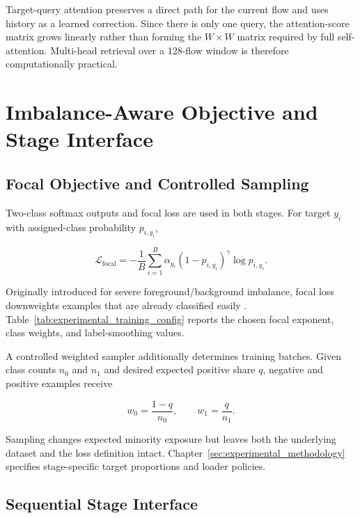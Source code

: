 \documentclass[11pt,fleqn]{report}
\begin{document}
Target-query attention preserves a direct path for the current flow and uses history as a learned correction. Since there is only one query, the attention-score matrix grows linearly rather than forming the $W\times W$ matrix required by full self-attention. Multi-head retrieval over a 128-flow window is therefore computationally practical.
\section{Imbalance-Aware Objective and Stage Interface}
\label{subsec:method_training}

\subsection{Focal Objective and Controlled Sampling}
\label{subsubsec:focal_training}

Two-class softmax outputs and focal loss are used in both stages. For target $y_i$ with assigned-class probability $p_{i,y_i}$,

\begin{equation}
    \mathcal{L}_{\mathrm{focal}}
    =-\frac{1}{B}
      \sum_{i=1}^{B}
      \alpha_{y_i}
      \left(1-p_{i,y_i}\right)^{\gamma}
      \log p_{i,y_i}.
    \label{eq:method_focal_loss}
\end{equation}

Originally introduced for severe foreground/background imbalance, focal loss downweights examples that are already classified easily \cite{Lin2017FocalLoss}. Table~\ref{tab:experimental_training_config} reports the chosen focal exponent, class weights, and label-smoothing values.

A controlled weighted sampler additionally determines training batches. Given class counts $n_0$ and $n_1$ and desired expected positive share $q$, negative and positive examples receive

\begin{equation}
    w_0=\frac{1-q}{n_0},
    \qquad
    w_1=\frac{q}{n_1}.
    \label{eq:controlled_sampler}
\end{equation}

Sampling changes expected minority exposure but leaves both the underlying dataset and the loss definition intact. Chapter~\ref{sec:experimental_methodology} specifies stage-specific target proportions and loader policies.

\subsection{Sequential Stage Interface}
\label{subsec:sequential_stage_interface}
\end{document}
